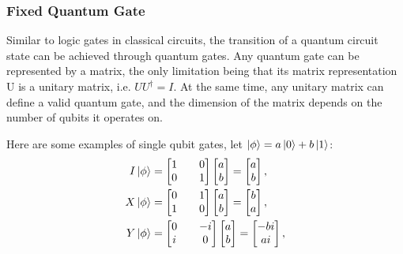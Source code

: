 \subsubsection{Fixed Quantum Gate}
Similar to logic gates in classical circuits, the transition of a quantum circuit state can be achieved through quantum gates. Any quantum gate can be represented by a matrix, the only limitation being that its matrix representation U is a unitary matrix, i.e. ${UU^{\dagger}=I}$.
At the same time, any unitary matrix can define a valid quantum gate, and the dimension of the matrix depends on the number of qubits it operates on.

Here are some examples of single qubit gates, let $\ket{\phi}=a\ket{0}+b\ket{1}$:
\begin{align*}
    I\ket{\phi} & =
    \begin{bmatrix}
        1 &  & 0 \\
        0 &  & 1
    \end{bmatrix}
    \begin{bmatrix}
        a \\
        b
    \end{bmatrix}=
    \begin{bmatrix}
        a \\
        b
    \end{bmatrix},  \\
    X\ket{\phi} & =
    \begin{bmatrix}
        0 &  & 1 \\
        1 &  & 0
    \end{bmatrix}
    \begin{bmatrix}
        a \\
        b
    \end{bmatrix}=
    \begin{bmatrix}
        b \\
        a
    \end{bmatrix},  \\
    Y\ket{\phi} & =
    \begin{bmatrix}
        0 &  & -i \\
        i &  & 0
    \end{bmatrix}
    \begin{bmatrix}
        a \\
        b
    \end{bmatrix}=
    \begin{bmatrix}
        -bi \\
        ai
    \end{bmatrix},  \\

\end{align*}
